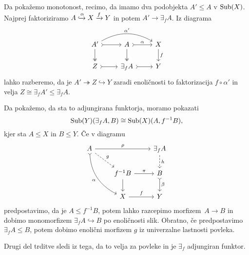 \documentclass[../kategoricna_logika.tex]{subfiles}
\begin{document}
\begin{dokaz}
  Da pokažemo monotonost, recimo, da imamo dva podobjekta $A' \leq A$ v
  $\operatorname{Sub}(X)$.  Najprej faktoriziramo
  $A \xhookrightarrow{\alpha} X \xrightarrow{f} Y$ in potem
  $A' \to \exists_f A$.  Iz diagrama
  \begin{equation*}
    \begin{tikzcd}
      A' \ar[d, two heads] \ar[r, tail] \ar[rr, bend left, "\alpha'"]
      &
      A \ar[d, two heads] \ar[r, tail, "\alpha"] & X \ar[d, "f"] \\
      Z \ar[r, tail] & \exists_f A \ar[r, tail] & Y
    \end{tikzcd}
  \end{equation*}
  lahko razberemo, da je $A' \twoheadrightarrow Z \hookrightarrow Y$
  zaradi enoličnosti to faktorizacija $f \circ \alpha'$ in velja
  $Z \cong \exists_f A' \leq \exists_f A$.

  Da pokažemo, da sta to adjungirana funktorja, moramo pokazati
  $$\operatorname{Sub}(Y)(\exists_f A, B) \cong \operatorname{Sub}(X)(A, f^{-1}B),$$
  kjer sta $A \leq X$ in $B \leq Y$. Če v diagramu
  \begin{equation*}
    \begin{tikzcd}
      A \ar[ddr, bend right, tail, "\alpha"'] \ar[dr, dashed, "g"]
      \ar[rr, "\rho"] & &
      \exists_f A \ar[d, dashed, "h"] \\
      & f^{-1}B \ar[d] \ar[r, "\pi"] & B \ar[d, tail, "\beta"] \\
      & X \ar[r, "f"] & Y
    \end{tikzcd}
  \end{equation*}
  predpostavimo, da je $A \leq f^{-1}B$, potem lahko
  razcepimo morfizem~$A \to B$ in dobimo monomorfizem
  $\exists_f A \hookrightarrow B$ po enoličnosti slik.  Obratno, če
  predpostavimo $\exists_fA \leq B$, potem dobimo enolični
  morfizem $g$ iz univerzalne lastnosti povleka.

  Drugi del trditve sledi iz tega, da to velja za povleke in je
  $\exists_f$ adjungiran funktor.
\end{dokaz}
%
\end{document}
